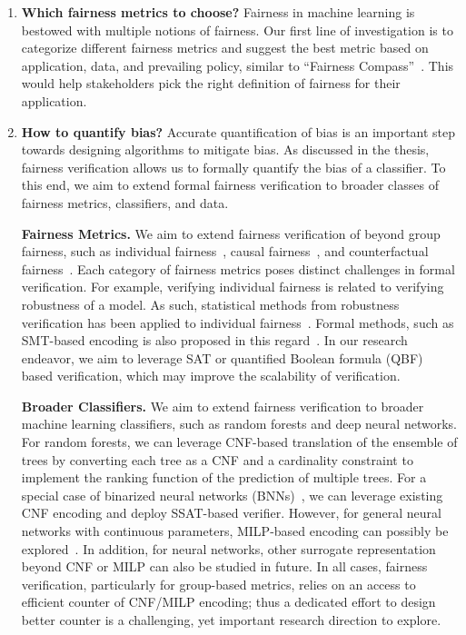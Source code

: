 \begin{itemize}
	\begin{enumerate}
		\item \textbf{Which fairness metrics to choose?} Fairness in machine learning is bestowed with multiple notions of fairness. Our first line of investigation is to categorize different fairness metrics  and suggest the best metric based on application, data, and prevailing policy, similar to ``Fairness Compass''~\cite{ruf2021towards}. This would help stakeholders pick the right definition of fairness for their application.
		
		\item \textbf{How to quantify bias?} Accurate quantification of bias is an important step towards designing algorithms to mitigate bias. As discussed in the thesis, fairness verification allows us to formally quantify the bias of a classifier. To this end, we aim to extend formal fairness verification to broader classes of fairness metrics, classifiers, and data. 
		
		
		\textbf{Fairness Metrics.} We aim to extend fairness verification of beyond group fairness, such as individual fairness~\cite{john2020verifying}, causal fairness~\cite{pan2021explaining,zhang2018fairness}, and counterfactual fairness~\cite{wu2019counterfactual,chiappa2019path}. Each category of fairness metrics poses distinct challenges in formal verification. For example, verifying individual fairness is related to verifying robustness of a model. As such, statistical methods from robustness verification has been applied to individual fairness~\cite{john2020verifying}. Formal methods, such as SMT-based encoding is also proposed in this regard~\cite{biswas2022fairify}. In our research endeavor, we aim to leverage  SAT or quantified Boolean formula (QBF) based verification, which may improve the scalability of verification.
		
		
		\textbf{Broader Classifiers.} We aim to extend fairness verification to broader machine learning classifiers, such as random forests and deep neural networks. For random forests, we can leverage CNF-based translation of the ensemble of trees by converting each tree as a CNF and a cardinality constraint to implement the ranking function of the prediction of multiple trees. For a special case of binarized neural networks (BNNs)~\cite{hubara2016binarized}, we can leverage existing CNF encoding and deploy SSAT-based verifier. However, for general neural networks with continuous parameters, MILP-based encoding can possibly be explored~\cite{mistry2022milp}. In addition, for neural networks, other surrogate representation beyond CNF or MILP can also be studied in future. In all cases, fairness verification, particularly for group-based metrics, relies on an access to efficient counter of CNF/MILP encoding; thus a dedicated effort to design better counter is a challenging, yet important research direction to explore.
		

\end{enumerate}
\end{itemize}
